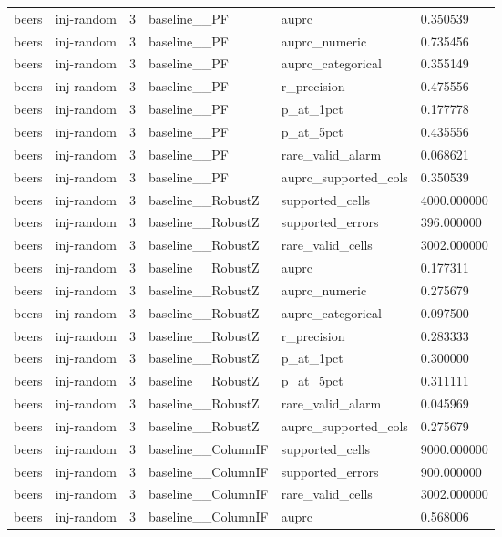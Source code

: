 \begin{tabular}{llllll}
beers & inj-random & 3 & baseline\_\_PF & auprc & 0.350539 \\
beers & inj-random & 3 & baseline\_\_PF & auprc\_numeric & 0.735456 \\
beers & inj-random & 3 & baseline\_\_PF & auprc\_categorical & 0.355149 \\
beers & inj-random & 3 & baseline\_\_PF & r\_precision & 0.475556 \\
beers & inj-random & 3 & baseline\_\_PF & p\_at\_1pct & 0.177778 \\
beers & inj-random & 3 & baseline\_\_PF & p\_at\_5pct & 0.435556 \\
beers & inj-random & 3 & baseline\_\_PF & rare\_valid\_alarm & 0.068621 \\
beers & inj-random & 3 & baseline\_\_PF & auprc\_supported\_cols & 0.350539 \\
beers & inj-random & 3 & baseline\_\_RobustZ & supported\_cells & 4000.000000 \\
beers & inj-random & 3 & baseline\_\_RobustZ & supported\_errors & 396.000000 \\
beers & inj-random & 3 & baseline\_\_RobustZ & rare\_valid\_cells & 3002.000000 \\
beers & inj-random & 3 & baseline\_\_RobustZ & auprc & 0.177311 \\
beers & inj-random & 3 & baseline\_\_RobustZ & auprc\_numeric & 0.275679 \\
beers & inj-random & 3 & baseline\_\_RobustZ & auprc\_categorical & 0.097500 \\
beers & inj-random & 3 & baseline\_\_RobustZ & r\_precision & 0.283333 \\
beers & inj-random & 3 & baseline\_\_RobustZ & p\_at\_1pct & 0.300000 \\
beers & inj-random & 3 & baseline\_\_RobustZ & p\_at\_5pct & 0.311111 \\
beers & inj-random & 3 & baseline\_\_RobustZ & rare\_valid\_alarm & 0.045969 \\
beers & inj-random & 3 & baseline\_\_RobustZ & auprc\_supported\_cols & 0.275679 \\
beers & inj-random & 3 & baseline\_\_ColumnIF & supported\_cells & 9000.000000 \\
beers & inj-random & 3 & baseline\_\_ColumnIF & supported\_errors & 900.000000 \\
beers & inj-random & 3 & baseline\_\_ColumnIF & rare\_valid\_cells & 3002.000000 \\
beers & inj-random & 3 & baseline\_\_ColumnIF & auprc & 0.568006 \\

\end{tabular}
